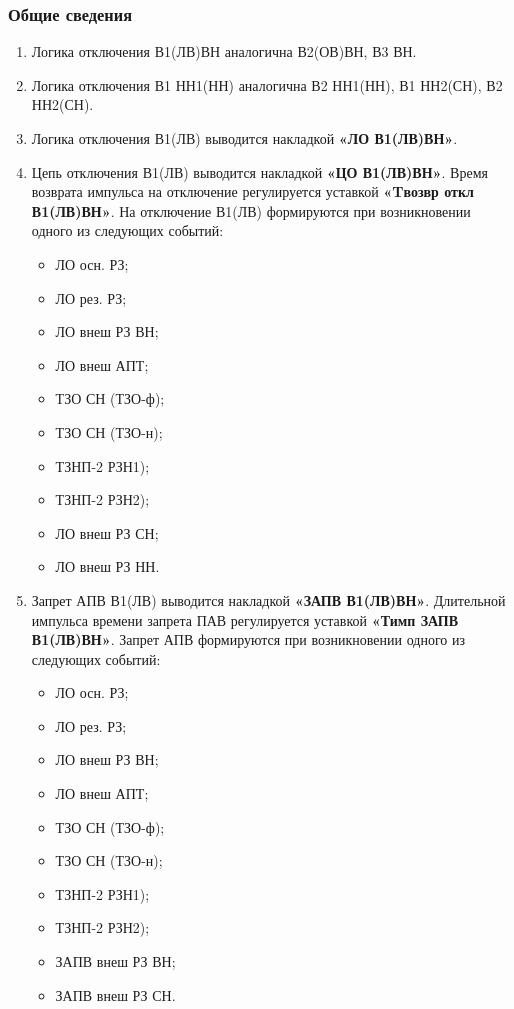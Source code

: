 \color{black}

\subsubsection{Общие сведения}

\begin{enumerate}[label=\arabic{section}.\arabic{subsection}.\arabic{subsubsection}.\arabic*,  align=left, labelsep=4pt, leftmargin=0pt, itemindent=57pt]

\item
Логика отключения В1(ЛВ)ВН аналогична В2(ОВ)ВН, В3 ВН.
\item
Логика отключения В1 НН1(НН) аналогична В2 НН1(НН), В1 НН2(СН), В2 НН2(СН).

\item
Логика отключения В1(ЛВ) выводится накладкой \textbf{«ЛО В1(ЛВ)ВН»}. 

\item
Цепь отключения В1(ЛВ) выводится накладкой \textbf{«ЦО В1(ЛВ)ВН»}. Время возврата импульса на
отключение регулируется уставкой \textbf{«Tвозвр откл В1(ЛВ)ВН»}. На отключение В1(ЛВ) формируются при
возникновении одного из следующих событий:
\begin{itemize}
\item ЛО осн. РЗ;
\item ЛО рез. РЗ;
\item ЛО внеш РЗ ВН;
\item ЛО внеш АПТ;
\item ТЗО СН (ТЗО-ф);
\item ТЗО СН (ТЗО-н);
\item ТЗНП-2 РЗН1);
\item ТЗНП-2 РЗН2);
\item ЛО внеш РЗ СН;
\item ЛО внеш РЗ НН.
\end{itemize}

\item
Запрет АПВ В1(ЛВ) выводится накладкой \textbf{«ЗАПВ В1(ЛВ)ВН»}. Длительной импульса времени
запрета ПАВ регулируется уставкой \textbf{«Тимп ЗАПВ В1(ЛВ)ВН»}. Запрет АПВ формируются при
возникновении одного из следующих событий:
\begin{itemize}
\item ЛО осн. РЗ;
\item ЛО рез. РЗ;
\item ЛО внеш РЗ ВН;
\item ЛО внеш АПТ;
\item ТЗО СН (ТЗО-ф);
\item ТЗО СН (ТЗО-н);
\item ТЗНП-2 РЗН1);
\item ТЗНП-2 РЗН2);
\item ЗАПВ внеш РЗ ВН;
\item ЗАПВ внеш РЗ СН.
\end{itemize}


\end{enumerate}
